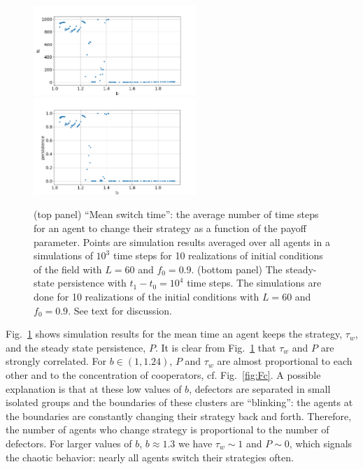 \documentclass[a4paper]{jpconf}
\begin{document}
\begin{figure}[H]
\begin{center}
	\includegraphics[width=0.55\textwidth, keepaspectratio=True]{Change_time.png} \\
%
	\includegraphics[width=0.55\textwidth, keepaspectratio=True]{Persistence.png}
	\caption{(top panel) ``Mean switch time'': the average number of time steps for an agent to change their strategy as a function of the payoff parameter.  
	Points are simulation results averaged over all agents in a simulations of $10^{3}$ time steps for 10 realizations of initial conditions of the field with $L=60$ and $f_0 = 0.9$.
	(bottom panel) The steady-state persistence with $t_1 - t_0 = 10^4$ time steps. The simulations are done for 10 realizations of the initial conditions with $L=60$ and $f_0 = 0.9$. See text for discussion.
	}
	\label{fig:persistence}
\end{center}
\end{figure}


Fig.\ \ref{fig:persistence} shows simulation results for the mean time an agent keeps the strategy, $\tau_w$, and the steady state persistence, $P$. It is clear from Fig.\ \ref{fig:persistence} that $\tau_w$ and $P$ are
strongly correlated. For $b\in(1, 1.24)$,  $P$ and $\tau_w$ are almost proportional to each other and to the concentration of cooperators, cf. Fig.\ \ref{fig:Fc}. 
A possible explanation is that at these low values of $b$, defectors are separated in small isolated groups
and the boundaries of these clusters are ``blinking'': the agents at the boundaries are constantly changing their strategy back and forth. Therefore, the number of agents who change strategy is proportional to the number of defectors.  
For larger values of $b$, $b \approx 1.3$ we have $\tau_w \sim 1$ and $P\sim 0$, which signals the chaotic behavior: nearly all agents switch their strategies often. 
\end{document}

